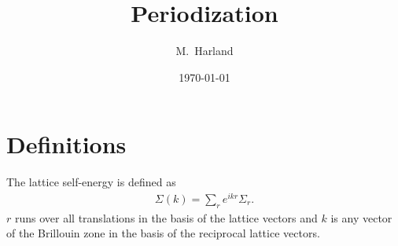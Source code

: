 \documentclass[12pt]{article}
\title{Periodization}
\date{\today}
\author{M.~Harland}
\begin{document}
\maketitle

\section{Definitions}
The lattice self-energy is defined as
\begin{align}
  \label{eq:dispersion}
  \Sigma(k) = \sum_r e^{ikr} \Sigma_r.
\end{align}
$r$ runs over all translations in the basis of the lattice vectors and $k$ is any vector of the Brillouin zone in the basis of the reciprocal lattice vectors.

\end{document}
